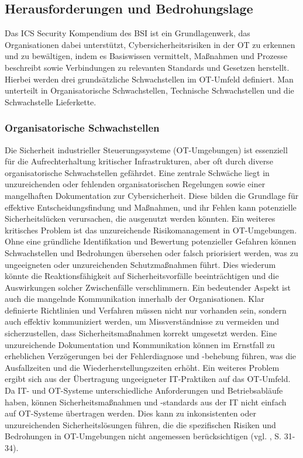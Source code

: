 \subsection{Herausforderungen und Bedrohungslage}

Das ICS Security Kompendium des BSI ist ein Grundlagenwerk, das Organisationen dabei unterstützt, Cybersicherheitsrisiken in der OT zu erkennen und zu bewältigen, indem es Basiswissen vermittelt, Maßnahmen und Prozesse beschreibt sowie Verbindungen zu relevanten Standards und Gesetzen herstellt. Hierbei werden drei grundsätzliche Schwachstellen im OT-Umfeld definiert. Man unterteilt in Organisatorische Schwachstellen, Technische Schwachstellen und die Schwachstelle Lieferkette. 

\subsubsection{Organisatorische Schwachstellen}

Die Sicherheit industrieller Steuerungssysteme (OT-Umgebungen) ist essenziell für die Aufrechterhaltung kritischer Infrastrukturen, aber oft durch diverse organisatorische Schwachstellen gefährdet. Eine zentrale Schwäche liegt in unzureichenden oder fehlenden organisatorischen Regelungen sowie einer mangelhaften Dokumentation zur Cybersicherheit. Diese bilden die Grundlage für effektive Entscheidungsfindung und Maßnahmen, und ihr Fehlen kann potenzielle Sicherheitslücken verursachen, die ausgenutzt werden könnten.
Ein weiteres kritisches Problem ist das unzureichende Risikomanagement in OT-Umgebungen. Ohne eine gründliche Identifikation und Bewertung potenzieller Gefahren können Schwachstellen und Bedrohungen übersehen oder falsch priorisiert werden, was zu ungeeigneten oder unzureichenden Schutzmaßnahmen führt. Dies wiederum könnte die Reaktionsfähigkeit auf Sicherheitsvorfälle beeinträchtigen und die Auswirkungen solcher Zwischenfälle verschlimmern. Ein bedeutender Aspekt ist auch die mangelnde Kommunikation innerhalb der Organisationen. Klar definierte Richtlinien und Verfahren müssen nicht nur vorhanden sein, sondern auch effektiv kommuniziert werden, um Missverständnisse zu vermeiden und sicherzustellen, dass Sicherheitsmaßnahmen korrekt umgesetzt werden. Eine unzureichende Dokumentation und Kommunikation können im Ernstfall zu erheblichen Verzögerungen bei der Fehlerdiagnose und -behebung führen, was die Ausfallzeiten und die Wiederherstellungszeiten erhöht. Ein weiteres Problem ergibt sich aus der Übertragung ungeeigneter IT-Praktiken auf das OT-Umfeld. Da IT- und OT-Systeme unterschiedliche Anforderungen und Betriebsabläufe haben, können Sicherheitsmaßnahmen und -standards aus der IT nicht einfach auf OT-Systeme übertragen werden. Dies kann zu inkonsistenten oder unzureichenden Sicherheitslösungen führen, die die spezifischen Risiken und Bedrohungen in OT-Umgebungen nicht angemessen berücksichtigen (vgl. \cite{ICS}, S. 31-34).


